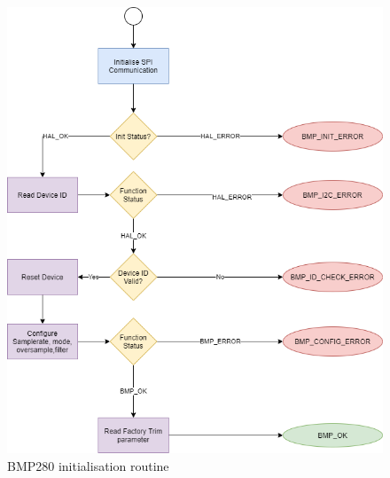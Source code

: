 \begin{figure}[H]
    \centering
    \includegraphics[scale=0.3]{Environmental Sensor Init Routine.png}
    \caption{BMP280 initialisation routine}
    \label{fig:Init_diagram_bmp}
\end{figure}

